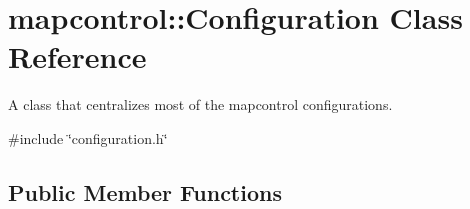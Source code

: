 \hypertarget{classmapcontrol_1_1_configuration}{\section{mapcontrol\-:\-:Configuration Class Reference}
\label{classmapcontrol_1_1_configuration}
}


A class that centralizes most of the mapcontrol configurations.  




{\ttfamily \#include \char`\"{}configuration.\-h\char`\"{}}

\subsection*{Public Member Functions}
